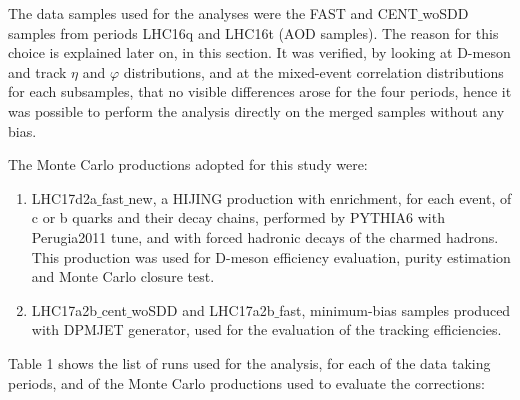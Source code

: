 The data samples used for the analyses were the FAST and CENT$\_$woSDD samples from periods LHC16q and LHC16t (AOD samples). The reason for this choice is explained later on, in this section. It was verified, by looking at D-meson and track $\eta$ and $\varphi$ distributions, and at the mixed-event correlation distributions for each subsamples, that no visible differences arose for the four periods, hence it was possible to perform the analysis directly on the merged samples without any bias.

The Monte Carlo productions adopted for this study were:
 \begin{enumerate}
 \item LHC17d2a$\_$fast$\_$new, a HIJING production with enrichment, for each event, of c or b quarks and their decay chains, performed by PYTHIA6 with Perugia2011 tune, and with forced hadronic decays of the charmed hadrons. This production was used for D-meson efficiency evaluation, purity estimation and Monte Carlo closure test.
 \item LHC17a2b$\_$cent$\_$woSDD and LHC17a2b$\_$fast, minimum-bias samples produced with DPMJET generator, used for the evaluation of the tracking efficiencies.
\end{enumerate}

Table 1 shows the list of runs used for the analysis, for each of the data taking periods, and of the Monte Carlo productions used to evaluate the corrections:

